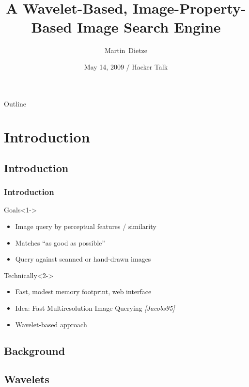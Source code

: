 \documentclass{beamer}
\title[Wavelet-Based Image Search] %
{A Wavelet-Based, Image-Property-Based Image Search Engine}
\author{Martin~Dietze}
\institute{Freiheit.com Technologies}
\date[Short Occasion] %
{May 14, 2009 / Hacker Talk}
\begin{document}
\begin{frame}
  \titlepage
\end{frame}

\begin{frame}{Outline}
  \tableofcontents
\end{frame}


\section{Introduction}
\subsection{Introduction}

\begin{frame}
  \frametitle{Introduction}

  \begin{block}{Goals}<1->
    \begin{itemize}
    \item Image query by perceptual features / similarity
    \item Matches ``as good as possible''
    \item Query against scanned or hand-drawn images
    \end{itemize}
  \end{block}

  \begin{block}{Technically}<2->
    \begin{itemize}
    \item Fast, modest memory footprint, web interface
    \item Idea: Fast Multiresolution Image Querying \emph{[Jacobs95]}
    \item Wavelet-based approach
    \end{itemize}
  \end{block}
\end{frame}

\subsection{Background}

\subsection{Wavelets}
\end{document}
